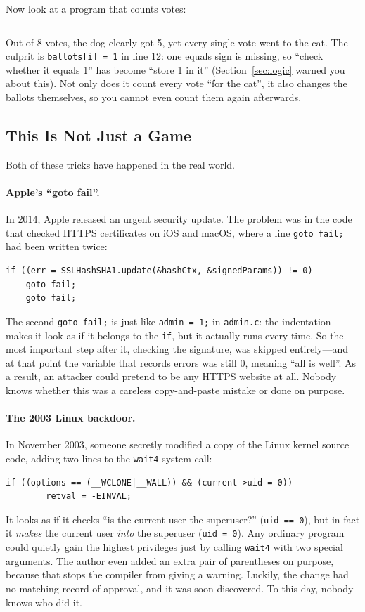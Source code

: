 Now look at a program that counts votes:


\inputminted[linenos=false]{text}{code/en/appc/out/vote.txt}

Out of 8 votes, the dog clearly got 5, yet every single vote went to the cat. The culprit is \texttt{ballots[i] = 1} in line 12: one equals sign is missing, so ``check whether it equals 1'' has become ``store 1 in it'' (Section~\ref{sec:logic} warned you about this). Not only does it count every vote ``for the cat'', it also changes the ballots themselves, so you cannot even count them again afterwards.

\subsection{This Is Not Just a Game}

Both of these tricks have happened in the real world.

\paragraph{Apple's ``goto fail''.}
In 2014, Apple released an urgent security update. The problem was in the code that checked HTTPS certificates on iOS and macOS, where a line \texttt{goto fail;} had been written twice:
\begin{verbatim}
if ((err = SSLHashSHA1.update(&hashCtx, &signedParams)) != 0)
    goto fail;
    goto fail;
\end{verbatim}
The second \texttt{goto fail;} is just like \texttt{admin = 1;} in \texttt{admin.c}: the indentation makes it look as if it belongs to the \texttt{if}, but it actually runs every time. So the most important step after it, checking the signature, was skipped entirely---and at that point the variable that records errors was still 0, meaning ``all is well''. As a result, an attacker could pretend to be any HTTPS website at all. Nobody knows whether this was a careless copy-and-paste mistake or done on purpose.

\paragraph{The 2003 Linux backdoor.}
In November 2003, someone secretly modified a copy of the Linux kernel source code, adding two lines to the \texttt{wait4} system call:
\begin{verbatim}
if ((options == (__WCLONE|__WALL)) && (current->uid = 0))
        retval = -EINVAL;
\end{verbatim}
It looks as if it checks ``is the current user the superuser?'' (\mbox{\texttt{uid == 0}}), but in fact it \emph{makes} the current user \emph{into} the superuser (\mbox{\texttt{uid = 0}}). Any ordinary program could quietly gain the highest privileges just by calling \texttt{wait4} with two special arguments. The author even added an extra pair of parentheses on purpose, because that stops the compiler from giving a warning. Luckily, the change had no matching record of approval, and it was soon discovered. To this day, nobody knows who did it.

